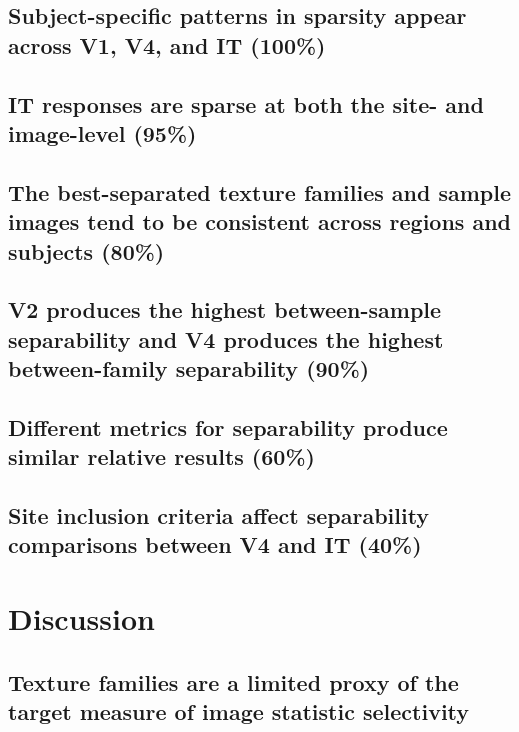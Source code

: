 \documentclass[
  11pt,
  letterpaper,
  DIV=11,
  numbers=noendperiod]{scrartcl}
\begin{document}
\subsection{Subject-specific patterns in sparsity appear across V1, V4,
and IT
(100\%)}\label{subject-specific-patterns-in-sparsity-appear-across-v1-v4-and-it-100}

\subsection{IT responses are sparse at both the site- and image-level
(95\%)}\label{it-responses-are-sparse-at-both-the-site--and-image-level-95}

\subsection{The best-separated texture families and sample images tend
to be consistent across regions and subjects
(80\%)}\label{the-best-separated-texture-families-and-sample-images-tend-to-be-consistent-across-regions-and-subjects-80}

\subsection{V2 produces the highest between-sample separability and V4
produces the highest between-family separability
(90\%)}\label{v2-produces-the-highest-between-sample-separability-and-v4-produces-the-highest-between-family-separability-90}

\subsection{Different metrics for separability produce similar relative
results
(60\%)}\label{different-metrics-for-separability-produce-similar-relative-results-60}

\subsection{Site inclusion criteria affect separability comparisons
between V4 and IT
(40\%)}\label{site-inclusion-criteria-affect-separability-comparisons-between-v4-and-it-40}

\section{Discussion}\label{discussion}

\subsection{Texture families are a limited proxy of the target measure
of image statistic
selectivity}\label{texture-families-are-a-limited-proxy-of-the-target-measure-of-image-statistic-selectivity}
\end{document}
